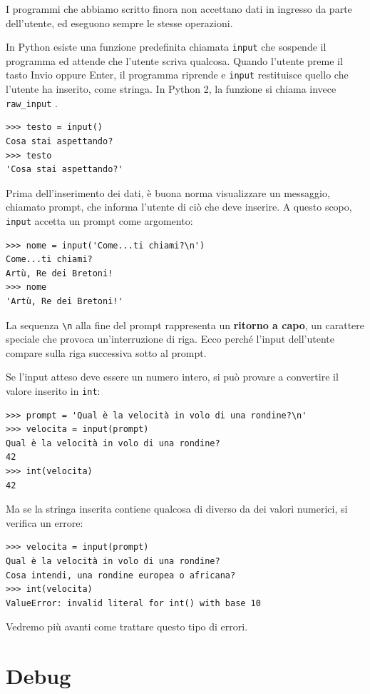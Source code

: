 \documentclass[10pt]{book}
\begin{document}
I programmi che abbiamo scritto finora non accettano dati in ingresso da parte dell'utente, ed eseguono sempre le stesse operazioni.

In Python esiste una funzione predefinita chiamata \verb"input" che sospende il programma ed attende che l'utente scriva qualcosa. Quando l'utente preme il tasto {\sf Invio} oppure {\sf Enter}, il programma riprende e \verb"input" restituisce quello che l'utente ha inserito, come stringa. In Python 2, la funzione si chiama invece \verb"raw_input" .

\begin{verbatim}
>>> testo = input()
Cosa stai aspettando?
>>> testo
'Cosa stai aspettando?'
\end{verbatim}
%
Prima dell'inserimento dei dati, è buona norma visualizzare un messaggio, chiamato prompt, che informa l'utente di ciò che deve inserire. A questo scopo, \verb"input" accetta un prompt come argomento:

\begin{verbatim}
>>> nome = input('Come...ti chiami?\n')
Come...ti chiami?
Artù, Re dei Bretoni!
>>> nome
'Artù, Re dei Bretoni!'
\end{verbatim}
%
La sequenza \verb"\n" alla fine del prompt rappresenta un {\bf ritorno a capo},
un carattere speciale che provoca un'interruzione di riga. Ecco perché l'input dell'utente compare sulla riga successiva sotto al prompt.

Se l'input atteso deve essere un numero intero, si può provare a convertire il valore inserito in {\tt int}:

\begin{verbatim}
>>> prompt = 'Qual è la velocità in volo di una rondine?\n'
>>> velocita = input(prompt)
Qual è la velocità in volo di una rondine?
42
>>> int(velocita)
42
\end{verbatim}
%
Ma se la stringa inserita contiene qualcosa di diverso da dei valori numerici, si verifica un errore:

\begin{verbatim}
>>> velocita = input(prompt)
Qual è la velocità in volo di una rondine?
Cosa intendi, una rondine europea o africana?
>>> int(velocita)
ValueError: invalid literal for int() with base 10
\end{verbatim}
%
Vedremo più avanti come trattare questo tipo di errori.


\section{Debug}
\label{whitespace}
\end{document}
